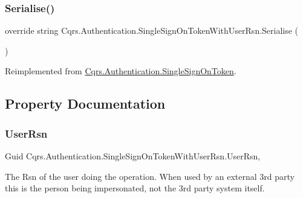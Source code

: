 \subsubsection{\texorpdfstring{Serialise()}{Serialise()}}
{\footnotesize\ttfamily override string Cqrs.\+Authentication.\+Single\+Sign\+On\+Token\+With\+User\+Rsn.\+Serialise (\begin{DoxyParamCaption}{ }\end{DoxyParamCaption})\hspace{0.3cm}{\ttfamily [virtual]}}



Reimplemented from \hyperlink{classCqrs_1_1Authentication_1_1SingleSignOnToken_a5e859c6c5db5aaa9ef4e8f2086df4604_a5e859c6c5db5aaa9ef4e8f2086df4604}{Cqrs.\+Authentication.\+Single\+Sign\+On\+Token}.



\subsection{Property Documentation}
\mbox{\label{classCqrs_1_1Authentication_1_1SingleSignOnTokenWithUserRsn_a47d20dd286cf61cc23028e75cddcca79_a47d20dd286cf61cc23028e75cddcca79}} 
\subsubsection{\texorpdfstring{User\+Rsn}{UserRsn}}
{\footnotesize\ttfamily Guid Cqrs.\+Authentication.\+Single\+Sign\+On\+Token\+With\+User\+Rsn.\+User\+Rsn\hspace{0.3cm}{\ttfamily [get]}, {\ttfamily [set]}}



The Rsn of the user doing the operation. When used by an external 3rd party this is the person being impersonated, not the 3rd party system itself. 

